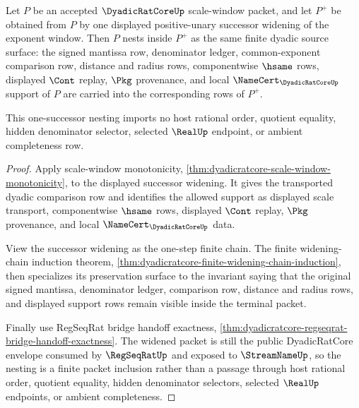 \begin{theorem}
\label{thm:dyadicratcore-successor-scale-window-nesting}
Let $P$ be an accepted $\DyadicRatCoreUp$ scale-window packet, and let $P^{+}$ be obtained from $P$ by one displayed positive-unary successor widening of the exponent window. Then $P$ nests inside $P^{+}$ as the same finite dyadic source surface: the signed mantissa row, denominator ledger, common-exponent comparison row, distance and radius rows, componentwise $\hsame$ rows, displayed $\Cont$ replay, $\Pkg$ provenance, and local $\NameCert_{\DyadicRatCoreUp}$ support of $P$ are carried into the corresponding rows of $P^{+}$.

This one-successor nesting imports no host rational order, quotient equality, hidden denominator selector, selected $\RealUp$ endpoint, or ambient completeness row.
\end{theorem}
\begin{proof}
Apply scale-window monotonicity, \autoref{thm:dyadicratcore-scale-window-monotonicity}, to the displayed successor widening. It gives the transported dyadic comparison row and identifies the allowed support as displayed scale transport, componentwise $\hsame$ rows, displayed $\Cont$ replay, $\Pkg$ provenance, and local $\NameCert_{\DyadicRatCoreUp}$ data.

View the successor widening as the one-step finite chain. The finite widening-chain induction theorem, \autoref{thm:dyadicratcore-finite-widening-chain-induction}, then specializes its preservation surface to the invariant saying that the original signed mantissa, denominator ledger, comparison row, distance and radius rows, and displayed support rows remain visible inside the terminal packet.

Finally use RegSeqRat bridge handoff exactness, \autoref{thm:dyadicratcore-regseqrat-bridge-handoff-exactness}. The widened packet is still the public DyadicRatCore envelope consumed by $\RegSeqRatUp$ and exposed to $\StreamNameUp$, so the nesting is a finite packet inclusion rather than a passage through host rational order, quotient equality, hidden denominator selectors, selected $\RealUp$ endpoints, or ambient completeness.
\end{proof}

